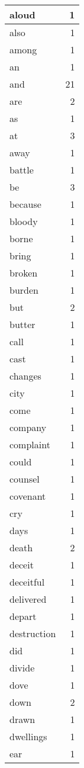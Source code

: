\begin{center}
\begin{longtable}{l|r}
aloud & 1 \\ \hline
also & 1 \\ \hline
among & 1 \\ \hline
an & 1 \\ \hline
and & 21 \\ \hline
are & 2 \\ \hline
as & 1 \\ \hline
at & 3 \\ \hline
away & 1 \\ \hline
battle & 1 \\ \hline
be & 3 \\ \hline
because & 1 \\ \hline
bloody & 1 \\ \hline
borne & 1 \\ \hline
bring & 1 \\ \hline
broken & 1 \\ \hline
burden & 1 \\ \hline
but & 2 \\ \hline
butter & 1 \\ \hline
call & 1 \\ \hline
cast & 1 \\ \hline
changes & 1 \\ \hline
city & 1 \\ \hline
come & 1 \\ \hline
company & 1 \\ \hline
complaint & 1 \\ \hline
could & 1 \\ \hline
counsel & 1 \\ \hline
covenant & 1 \\ \hline
cry & 1 \\ \hline
days & 1 \\ \hline
death & 2 \\ \hline
deceit & 1 \\ \hline
deceitful & 1 \\ \hline
delivered & 1 \\ \hline
depart & 1 \\ \hline
destruction & 1 \\ \hline
did & 1 \\ \hline
divide & 1 \\ \hline
dove & 1 \\ \hline
down & 2 \\ \hline
drawn & 1 \\ \hline
dwellings & 1 \\ \hline
ear & 1 \\ \hline

\end{longtable}
\end{center}
